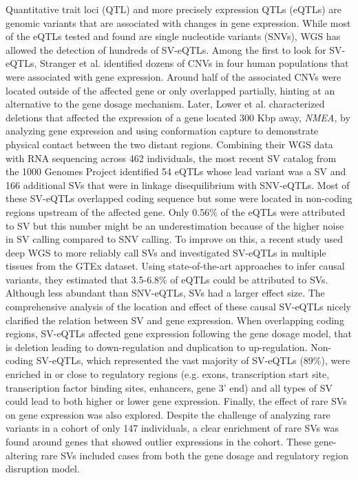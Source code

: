 Quantitative trait loci (QTL) and more precisely expression QTLs (eQTLs) are genomic variants that are associated with changes in gene expression.
While most of the eQTLs tested and found are single nucleotide variants (SNVs), WGS has allowed the detection of hundreds of SV-eQTLs.
Among the first to look for SV-eQTLs, Stranger et al. identified dozens of CNVs in four human populations that were associated with gene expression\cite{Stranger2007b}.
Around half of the associated CNVs were located outside of the affected gene or only overlapped partially, hinting at an alternative to the gene dosage mechanism.
Later, Lower et al. characterized deletions that affected the expression of a gene located 300 Kbp away, {\it NMEA}, by analyzing gene expression and using conformation capture to demonstrate physical contact between the two distant regions\cite{Lower2009}.
Combining their WGS data with RNA sequencing across 462 individuals, the most recent SV catalog from the 1000 Genomes Project identified 54 eQTLs whose lead variant was a SV and 166 additional SVs that were in linkage disequilibrium with SNV-eQTLs\cite{Sudmant2015a}.
Most of these SV-eQTLs overlapped coding sequence but some were located in non-coding regions upstream of the affected gene.
Only 0.56\% of the eQTLs were attributed to SV but this number might be an underestimation because of the higher noise in SV calling compared to SNV calling.
To improve on this, a recent study used deep WGS to more reliably call SVs and investigated SV-eQTLs in multiple tissues from the GTEx dataset\cite{Chiang2017}.
Using state-of-the-art approaches to infer causal variants, they estimated that 3.5-6.8\% of eQTLs could be attributed to SVs.
Although less abundant than SNV-eQTLs, SVs had a larger effect size.
The comprehensive analysis of the location and effect of these causal SV-eQTLs nicely clarified the relation between SV and gene expression.
When overlapping coding regions, SV-eQTLs affected gene expression following the gene dosage model, that is deletion leading to down-regulation and duplication to up-regulation.
Non-coding SV-eQTLs, which represented the vast majority of SV-eQTLs (89\%), were enriched in or close to regulatory regions (e.g. exons, transcription start site, transcription factor binding sites, enhancers, gene 3’ end) and all types of SV could lead to both higher or lower gene expression.
Finally, the effect of rare SVs on gene expression was also explored.
Despite the challenge of analyzing rare variants in a cohort of only 147 individuals, a clear enrichment of rare SVs was found around genes that showed outlier expressions in the cohort.
These gene-altering rare SVs included cases from both the gene dosage and regulatory region disruption model.

